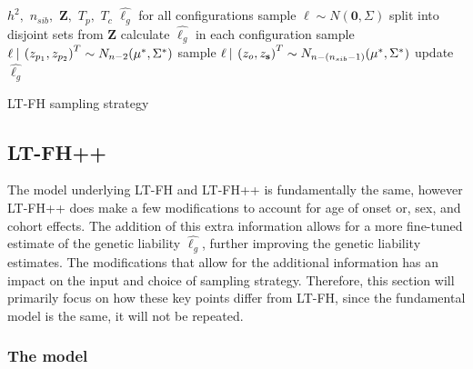 \begin{algorithm}[h] 
\begin{algorithmic}[1] 
\INPUT $ h^2,$  $n_{sib},$  $\mathbf{Z},$  $T_p,$  $T_c$ 
\OUTPUT $ \hat{\ell_g} $ for all configurations
\STATE sample $ \ell \sim N(\mathbf{0}, \Sigma) $ 
\STATE split into disjoint sets from $ \mathbf{Z} $
\STATE calculate $ \hat{\ell_g} $ in each configuration 
		\STATE sample  $ \ell \:\vert\: \left(z_{p_1}, z_{p_2} \right)^T \sim N_{n-2}(\mu^{\ast}, \Sigma^{\ast}) $
		\STATE sample $ \ell \:\vert\: \left(z_{o}, z_{\mathbf{s}} \right)^T \sim N_{n-(n_{sib} - 1)}(\mu^{\ast}, \Sigma^{\ast}) $
	\ENDIF	
	\STATE update $ \hat{\ell_g} $
\ENDWHILE
\end{algorithmic}
\caption{LT-FH sampling strategy}
\label{alg:LTFH}
\end{algorithm}


\subsection{LT-FH++}

The model underlying LT-FH and LT-FH++ is fundamentally the same, however LT-FH++ does make a few modifications to account for age of onset or, sex, and cohort effects. The addition of this extra information allows for a more fine-tuned estimate of the genetic liability $ \hat{\ell_g} $, further improving the genetic liability estimates. The modifications that allow for the additional information has an impact on the input and choice of sampling strategy. Therefore, this section will primarily focus on how these key points differ from LT-FH, since the fundamental model is the same, it will not be repeated. 

\subsubsection{The model}

